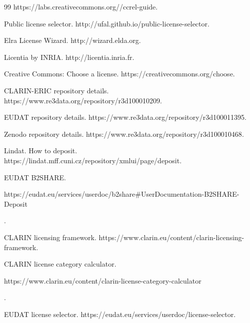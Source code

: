 {{\begin{thebibliography}{99}
{https://labs.creativecommons.org//ccrel-guide}.


Public license selector. {\sf http://ufal.github.io/public-license-selector}.


Elra License Wizard. {\sf http://wizard.elda.org}.


Licentia by INRIA. {\sf http://licentia.inria.fr}.


Creative Commons: Choose a license. {\sf https://creativecommons.org/choose}.


CLARIN-ERIC repository details.  {\sf https://www.re3data.org/repository/\linebreak r3d100010209}.



\pagebreak




EUDAT repository details.  {\sf https://www.re3data.org/repository/r3d100011395}.


Zenodo repository details.  {\sf https://www.re3data.org/repository/r3d100010468}.


Lindat. How to deposit. {\sf https://lindat.mff.cuni.cz/repository/xmlui/page/deposit}.


EUDAT B2SHARE. {\sf

https://eudat.eu/services/userdoc/b2share\#UserDocumen\linebreak tation-B2SHARE-Deposit}.


CLARIN licensing framework. {\sf https://www.clarin.eu/content/clarin-licensing-framework}.


CLARIN license category calculator. {\sf 

https://www.clarin.eu/content/clarin-license-category-calculator}.


EUDAT license selector. {\sf https://eudat.eu/services/userdoc/license-selector}.


\end{thebibliography}}}
